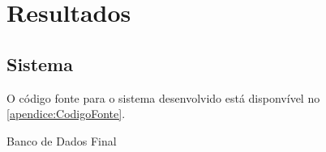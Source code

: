 \chapter{Resultados} \label{chap:resultados} %



\section{Sistema} %

O código fonte para o sistema desenvolvido está disponvível no \autoref{apendice:CodigoFonte}.

\begin{MyCenteredFigure}
  \caption{Banco de Dados Final}
  \label{fig:BD_Final}
\end{MyCenteredFigure}

